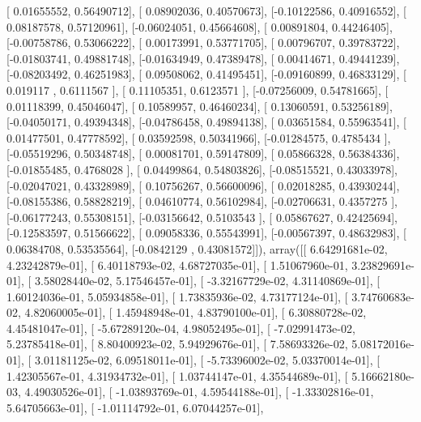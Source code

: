 \documentclass{article}
\begin{document}
       [ 0.01655552,  0.56490712],
       [ 0.08902036,  0.40570673],
       [-0.10122586,  0.40916552],
       [ 0.08187578,  0.57120961],
       [-0.06024051,  0.45664608],
       [ 0.00891804,  0.44246405],
       [-0.00758786,  0.53066222],
       [ 0.00173991,  0.53771705],
       [ 0.00796707,  0.39783722],
       [-0.01803741,  0.49881748],
       [-0.01634949,  0.47389478],
       [ 0.00414671,  0.49441239],
       [-0.08203492,  0.46251983],
       [ 0.09508062,  0.41495451],
       [-0.09160899,  0.46833129],
       [ 0.019117  ,  0.6111567 ],
       [ 0.11105351,  0.6123571 ],
       [-0.07256009,  0.54781665],
       [ 0.01118399,  0.45046047],
       [ 0.10589957,  0.46460234],
       [ 0.13060591,  0.53256189],
       [-0.04050171,  0.49394348],
       [-0.04786458,  0.49894138],
       [ 0.03651584,  0.55963541],
       [ 0.01477501,  0.47778592],
       [ 0.03592598,  0.50341966],
       [-0.01284575,  0.4785434 ],
       [-0.05519296,  0.50348748],
       [ 0.00081701,  0.59147809],
       [ 0.05866328,  0.56384336],
       [-0.01855485,  0.4768028 ],
       [ 0.04499864,  0.54803826],
       [-0.08515521,  0.43033978],
       [-0.02047021,  0.43328989],
       [ 0.10756267,  0.56600096],
       [ 0.02018285,  0.43930244],
       [-0.08155386,  0.58828219],
       [ 0.04610774,  0.56102984],
       [-0.02706631,  0.4357275 ],
       [-0.06177243,  0.55308151],
       [-0.03156642,  0.5103543 ],
       [ 0.05867627,  0.42425694],
       [-0.12583597,  0.51566622],
       [ 0.09058336,  0.55543991],
       [-0.00567397,  0.48632983],
       [ 0.06384708,  0.53535564],
       [-0.0842129 ,  0.43081572]]), array([[  6.64291681e-02,   4.23242879e-01],
       [  6.40118793e-02,   4.68727035e-01],
       [  1.51067960e-01,   3.23829691e-01],
       [  3.58028440e-02,   5.17546457e-01],
       [ -3.32167729e-02,   4.31140869e-01],
       [  1.60124036e-01,   5.05934858e-01],
       [  1.73835936e-02,   4.73177124e-01],
       [  3.74760683e-02,   4.82060005e-01],
       [  1.45948948e-01,   4.83790100e-01],
       [  6.30880728e-02,   4.45481047e-01],
       [ -5.67289120e-04,   4.98052495e-01],
       [ -7.02991473e-02,   5.23785418e-01],
       [  8.80400923e-02,   5.94929676e-01],
       [  7.58693326e-02,   5.08172016e-01],
       [  3.01181125e-02,   6.09518011e-01],
       [ -5.73396002e-02,   5.03370014e-01],
       [  1.42305567e-01,   4.31934732e-01],
       [  1.03744147e-01,   4.35544689e-01],
       [  5.16662180e-03,   4.49030526e-01],
       [ -1.03893769e-01,   4.59544188e-01],
       [ -1.33302816e-01,   5.64705663e-01],
       [ -1.01114792e-01,   6.07044257e-01],
\end{document}
